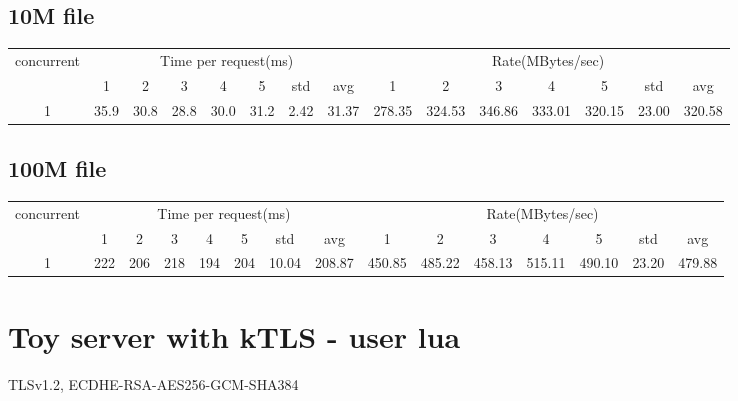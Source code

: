 \documentclass{article}
\begin{document}
\subsection*{10M file}
\begin{table}[H]
    \begin{tabular}{|c|c|c|c|c|c|c|c|c|c|c|c|c|c|c|}
        \hline
        \multirow{2}{*}{concurrent} & \multicolumn{7}{c|}{Time per request(ms)} & \multicolumn{7}{c|}{Rate(MBytes/sec)}                                                                                                   \\ \cline{2-15}
                                    & 1                                         & 2                                     & 3    & 4    & 5    & std  & avg   & 1      & 2      & 3      & 4      & 5      & std   & avg    \\ \hline
        1                           & 35.9                                      & 30.8                                  & 28.8 & 30.0 & 31.2 & 2.42 & 31.37 & 278.35 & 324.53 & 346.86 & 333.01 & 320.15 & 23.00 & 320.58 \\ \hline
    \end{tabular}
\end{table}
\subsection*{100M file}
\begin{table}[H]
    \begin{tabular}{|c|c|c|c|c|c|c|c|c|c|c|c|c|c|c|}
        \hline
        \multirow{2}{*}{concurrent} & \multicolumn{7}{c|}{Time per request(ms)} & \multicolumn{7}{c|}{Rate(MBytes/sec)}                                                                                                  \\ \cline{2-15}
                                    & 1                                         & 2                                     & 3   & 4   & 5   & std   & avg    & 1      & 2      & 3      & 4      & 5      & std   & avg    \\ \hline
        1                           & 222                                       & 206                                   & 218 & 194 & 204 & 10.04 & 208.87 & 450.85 & 485.22 & 458.13 & 515.11 & 490.10 & 23.20 & 479.88 \\ \hline
    \end{tabular}
\end{table}

\section*{Toy server with kTLS - user lua}
TLSv1.2, ECDHE-RSA-AES256-GCM-SHA384
\end{document}
